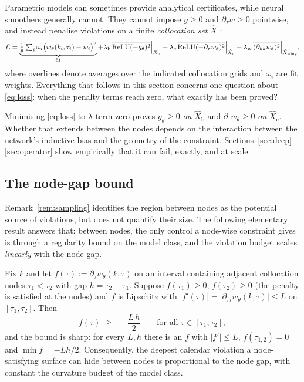 Parametric models can sometimes provide analytical certificates, while neural smoothers generally
cannot. They cannot impose $g\ge0$ and $\partial_\tau w\ge0$ pointwise, and instead penalise
violations on a finite \emph{collocation set} $\hat X$ \cite{ackerer2020,hoshisashi2023}:
\begin{equation}\label{eq:loss}
\mathcal L=\underbrace{\tfrac1p\textstyle\sum_i\omega_i\bigl(w_\theta(k_i,\tau_i)-w_i\bigr)^2}_{\text{fit}}
+\lambda_{\mathrm b}\,\overline{\operatorname{ReLU}(-g_\theta)^2}\Big|_{\hat X_{\mathrm b}}
+\lambda_{\mathrm c}\,\overline{\operatorname{ReLU}(-\partial_\tau w_\theta)^2}\Big|_{\hat X_{\mathrm c}}
+\lambda_{\mathrm w}\,\overline{(\partial_{kk}w_\theta)^2}\Big|_{\hat X_{\mathrm{wing}}},
\end{equation}
where overlines denote averages over the indicated collocation grids and $\omega_i$ are fit
weights. Everything that follows in this section concerns one question about \eqref{eq:loss}:
when the penalty terms reach zero, what exactly has been proved?

\begin{remark}\label{rem:sampling}
Minimising \eqref{eq:loss} to $\lambda$-term zero proves $g_\theta\ge0$ \emph{on}
$\hat X_{\mathrm b}$ and $\partial_\tau w_\theta\ge0$ \emph{on} $\hat X_{\mathrm c}$. Whether
that extends between the nodes depends on the interaction between the network's inductive bias
and the geometry of the constraint. Sections~\ref{sec:deep}--\ref{sec:operator} show empirically
that it can fail, exactly, and at scale.
\end{remark}

\subsection{The node-gap bound}

Remark~\ref{rem:sampling} identifies the region between nodes as the potential source of
violations, but does not quantify their size. The following elementary result answers that:
between nodes, the only control a node-wise constraint gives is through a regularity bound on the
model class, and the violation budget scales \emph{linearly} with the node gap.

\begin{theorem}\label{prop:nodegap}
Fix $k$ and let $f(\tau):=\partial_\tau w_\theta(k,\tau)$ on an interval containing adjacent
collocation nodes $\tau_1<\tau_2$ with gap $h=\tau_2-\tau_1$. Suppose $f(\tau_1)\ge0$,
$f(\tau_2)\ge0$ (the penalty is satisfied at the nodes) and $f$ is Lipschitz with
$|f'(\tau)|=|\partial_{\tau\tau}w_\theta(k,\tau)|\le L$ on $[\tau_1,\tau_2]$. Then
\[
f(\tau)\;\ge\;-\,\frac{L\,h}{2}\qquad\text{for all }\tau\in[\tau_1,\tau_2],
\]
and the bound is sharp: for every $L,h$ there is an $f$ with $|f'|\le L$, $f(\tau_{1,2})=0$
and $\min f=-Lh/2$. Consequently, the deepest calendar violation a node-satisfying surface can
hide between nodes is proportional to the node gap, with constant the curvature budget of the
model class.
\end{theorem}

